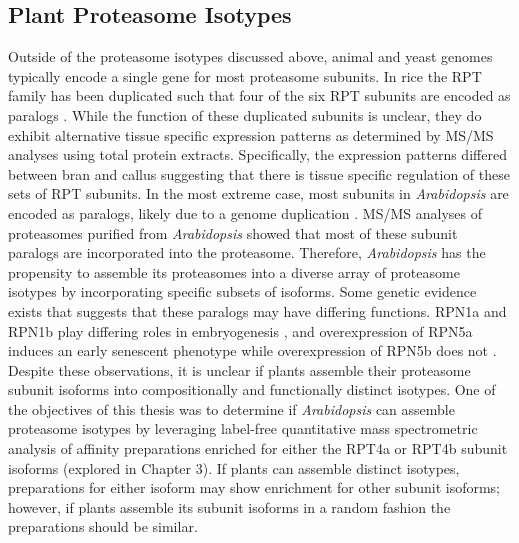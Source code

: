 \subsection{Plant Proteasome Isotypes}
	Outside of the proteasome isotypes discussed above, animal and yeast genomes typically encode a single gene for most proteasome subunits. In rice the RPT family has been duplicated such that four of the six RPT subunits are encoded as paralogs \citep{shibahara04}. While the function of these duplicated subunits is unclear, they do exhibit alternative tissue specific expression patterns as determined by MS/MS analyses using total protein extracts. Specifically, the expression patterns differed between bran and callus suggesting that there is tissue specific regulation of these sets of RPT subunits. 
In the most extreme case, most subunits in \textit{Arabidopsis} are encoded as paralogs, likely due to a genome duplication \citep{book10, fu98}. MS/MS analyses of proteasomes purified from \textit{Arabidopsis} showed that most of these subunit paralogs are incorporated into the proteasome. Therefore, \textit{Arabidopsis} has the propensity to assemble its proteasomes into a diverse array of proteasome isotypes by incorporating specific subsets of isoforms. Some genetic evidence exists that suggests that these paralogs may have differing functions. RPN1a and RPN1b play differing roles in embryogenesis \citep{brukhin05}, and overexpression of RPN5a induces an early senescent phenotype while overexpression of RPN5b does not \citep{book09}.  Despite these observations, it is unclear if plants assemble their proteasome subunit isoforms into compositionally and functionally distinct isotypes. One of the objectives of this thesis was to determine if \textit{Arabidopsis} can assemble proteasome isotypes by leveraging label-free quantitative mass spectrometric analysis of affinity preparations enriched for either the RPT4a or RPT4b subunit isoforms (explored in Chapter 3). If plants can assemble distinct isotypes, preparations for either isoform may show enrichment for other subunit isoforms; however, if plants assemble its subunit isoforms in a random fashion the preparations should be similar. 


